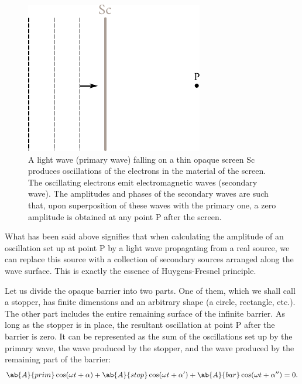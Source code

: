 \begin{figure}[!htb]
	\begin{center}
		\includegraphics[scale=1]{figures/ch_18/fig_18_3.pdf}
        \caption[]{A light wave (primary wave) falling on a thin opaque screen Sc produces oscillations of the electrons in the material of the screen. The oscillating electrons emit electromagnetic waves (secondary wave). The amplitudes and phases of the secondary waves are such that, upon superposition of these waves with the primary one, a zero amplitude is obtained at any point P after the screen.}
		\label{fig:18_3}
	\end{center}
	\vspace{-0.8cm}
\end{figure}

What has been said above signifies that when calculating the amplitude of an oscillation set up at point P by a light wave propagating from a real source, we can replace this source with a collection of secondary sources arranged along the wave surface.
This is exactly the essence of Huygens-Fresnel principle.

Let us divide the opaque barrier into two parts.
One of them, which we shall call a stopper, has finite dimensions and an arbitrary shape (a circle, rectangle, etc.).
The other part includes the entire remaining surface of the infinite barrier.
As long as the stopper is in place, the resultant oscillation at point P after the barrier is zero.
It can be represented as the sum of the oscillations set up by the primary wave, the wave produced by the stopper, and the wave produced by
the remaining part of the barrier:
\begin{equation}\label{eq:18_3}
    \ab{A}{prim} \cos(\omega t+\alpha) + \ab{A}{stop} \cos(\omega t+\alpha') + \ab{A}{bar} \cos(\omega t+\alpha'') = 0.
\end{equation}

